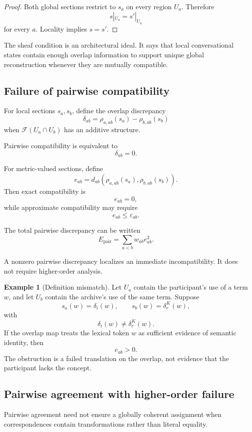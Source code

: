 \documentclass[11pt]{article}
\theoremstyle{definition}
\newtheorem{example}[definition]{Example}
\newcommand{\eps}{\varepsilon}
\begin{document}
\begin{proof}
Both global sections restrict to \(s_a\) on every region \(U_a\). Therefore
\[
s|_{U_a}
=
s'|_{U_a}
\]
for every \(a\). Locality implies \(s=s'\).
\end{proof}

The sheaf condition is an architectural ideal. It says that local conversational states contain enough overlap information to support unique global reconstruction whenever they are mutually compatible.

\subsection{Failure of pairwise compatibility}

For local sections \(s_a,s_b\), define the overlap discrepancy
\[
\delta_{ab}
=
\rho_{a,ab}(s_a)
-
\rho_{b,ab}(s_b)
\]
when \(\mathscr F(U_a\cap U_b)\) has an additive structure.

Pairwise compatibility is equivalent to
\[
\delta_{ab}=0.
\]

For metric-valued sections, define
\[
e_{ab}
=
d_{ab}
\left(
\rho_{a,ab}(s_a),
\rho_{b,ab}(s_b)
\right).
\]
Then exact compatibility is
\[
e_{ab}=0,
\]
while approximate compatibility may require
\[
e_{ab}\leq\eps_{ab}.
\]

The total pairwise discrepancy can be written
\[
E_{\mathrm{pair}}
=
\sum_{a<b}
w_{ab}e_{ab}^2.
\]

A nonzero pairwise discrepancy localizes an immediate incompatibility. It does not require higher-order analysis.

\begin{example}[Definition mismatch]
Let \(U_a\) contain the participant's use of a term \(w\), and let \(U_b\) contain the archive's use of the same term. Suppose
\[
s_a(w)=\delta_i(w),
\qquad
s_b(w)=\delta_r^K(w),
\]
with
\[
\delta_i(w)\neq\delta_r^K(w).
\]
If the overlap map treats the lexical token \(w\) as sufficient evidence of semantic identity, then
\[
e_{ab}>0.
\]
The obstruction is a failed translation on the overlap, not evidence that the participant lacks the concept.
\end{example}

\subsection{Pairwise agreement with higher-order failure}

Pairwise agreement need not ensure a globally coherent assignment when correspondences contain transformations rather than literal equality.
\end{document}
